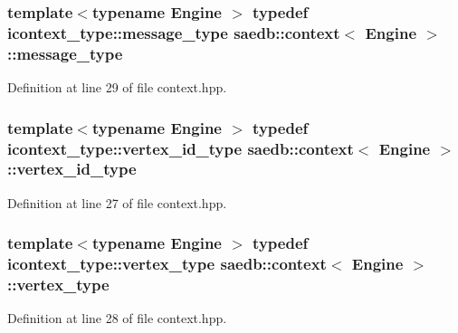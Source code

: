 \hypertarget{classsaedb_1_1context_ad29784e44db80b03b0adab9a2d8f2c72}{
\subsubsection[{message\-\_\-type}]{\setlength{\rightskip}{0pt plus 5cm}template$<$typename Engine $>$ typedef {\bf icontext\-\_\-type\-::message\-\_\-type} {\bf saedb\-::context}$<$ Engine $>$\-::{\bf message\-\_\-type}}}\label{d1/d89/classsaedb_1_1context_ad29784e44db80b03b0adab9a2d8f2c72}


Definition at line 29 of file context.\-hpp.

\hypertarget{classsaedb_1_1context_aba9540d1189edf19f3d1cb7363b5c40b}{
\subsubsection[{vertex\-\_\-id\-\_\-type}]{\setlength{\rightskip}{0pt plus 5cm}template$<$typename Engine $>$ typedef {\bf icontext\-\_\-type\-::vertex\-\_\-id\-\_\-type} {\bf saedb\-::context}$<$ Engine $>$\-::{\bf vertex\-\_\-id\-\_\-type}}}\label{d1/d89/classsaedb_1_1context_aba9540d1189edf19f3d1cb7363b5c40b}


Definition at line 27 of file context.\-hpp.

\hypertarget{classsaedb_1_1context_a62f418b2b73082cd65a88feb604bab9f}{
\subsubsection[{vertex\-\_\-type}]{\setlength{\rightskip}{0pt plus 5cm}template$<$typename Engine $>$ typedef {\bf icontext\-\_\-type\-::vertex\-\_\-type} {\bf saedb\-::context}$<$ Engine $>$\-::{\bf vertex\-\_\-type}}}\label{d1/d89/classsaedb_1_1context_a62f418b2b73082cd65a88feb604bab9f}


Definition at line 28 of file context.\-hpp.




